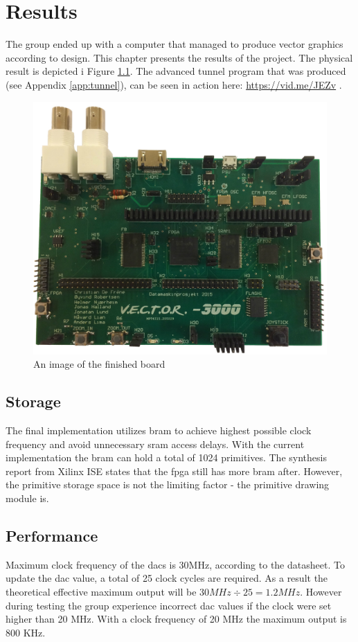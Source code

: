 \chapter{Results}
The group ended up with a computer that managed to produce vector graphics according to design. 
This chapter presents the results of the project. 
The physical result is depicted i Figure \ref{fig:board-top}.
The advanced tunnel program that was produced (see Appendix \ref{app:tunnel}), can be seen in action here: \href{https://vid.me/JEZv}{https://vid.me/JEZv} \cite{tunnel-demo}.

\begin{figure}[h!]
	    \includegraphics[width=\linewidth]{images/board_top.jpg}
	    \caption{An image of the finished \vthreek board}
	    \label{fig:board-top}
\end{figure}

\section{Storage}
The final implementation utilizes \gls{bram} to achieve highest possible clock frequency and avoid unnecessary \gls{sram} access delays.
With the current implementation the \gls{bram} can hold a total of 1024 primitives.
The synthesis report from Xilinx ISE states that the \gls{fpga} still has more \gls{bram} after.
However, the primitive storage space is not the limiting factor - the primitive drawing module is.

\section{Performance}
Maximum clock frequency of the \gls{dac}s is 30MHz, according to the datasheet\cite{dac-datasheet}.
To update the \gls{dac} value, a total of 25 clock cycles are required.
As a result the theoretical effective maximum output will be \(30 MHz \div 25 = 1.2 MHz \).
However during testing the group experience incorrect \gls{dac} values if the clock were set higher than 20 MHz.
With a clock frequency of 20 MHz the maximum output is 800 KHz.

